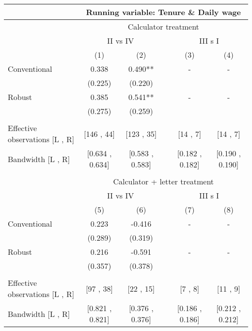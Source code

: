 \begin{tabular}{lccccc}
\toprule
      & \multicolumn{5}{c}{Running variable: Tenure \& Daily wage} \\
\midrule
      & \multicolumn{5}{c}{Calculator treatment} \\
\midrule
      & \multicolumn{2}{c}{II vs IV} &       & \multicolumn{2}{c}{III s I} \\
\cmidrule{2-3}\cmidrule{5-6}      & (1)   & (2)   &       & (3)   & (4) \\
\midrule
\midrule
Conventional & 0.338 & 0.490** &       & -     & - \\
      & (0.225) & (0.220) &       &       &  \\
Robust & 0.385 & 0.541** &       & -     & - \\
      & (0.275) & (0.259) &       &       &  \\
      &       &       &       &       &  \\
\midrule
Effective observations [L , R] & [146 ,  44] & [123 ,  35] &       & [14 ,  7] & [14 ,  7] \\
Bandwidth [L , R] & [0.634 ,  0.634] & [0.583 ,  0.583] &       & [0.182 ,  0.182] & [0.190 ,  0.190] \\
\midrule
\midrule
      &       &       &       &       &  \\
\midrule
      & \multicolumn{5}{c}{Calculator + letter treatment} \\
\midrule
      & \multicolumn{2}{c}{II vs IV} &       & \multicolumn{2}{c}{III s I} \\
\cmidrule{2-3}\cmidrule{5-6}      & (5)   & (6)   &       & (7)   & (8) \\
\midrule
\midrule
Conventional & 0.223 & -0.416 &       & -     & - \\
      & (0.289) & (0.319) &       &       &  \\
Robust & 0.216 & -0.591 &       & -     & - \\
      & (0.357) & (0.378) &       &       &  \\
      &       &       &       &       &  \\
\midrule
Effective observations [L , R] & [97 ,  38] & [22 ,  15] &       & [7 ,  8] & [11 ,  9] \\
Bandwidth [L , R] & [0.821 ,  0.821] & [0.376 ,  0.376] &       & [0.186 ,  0.186] & [0.212 ,  0.212] \\
\bottomrule
\bottomrule
\end{tabular}%

